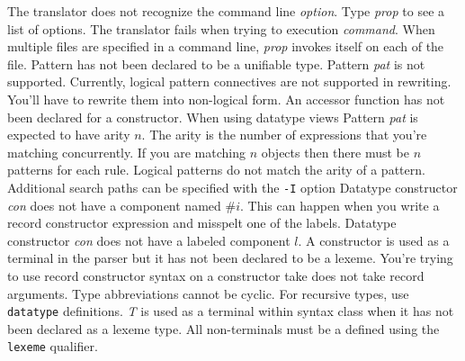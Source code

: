 \begin{Error}
  The translator does not recognize 
the command line {\em option}.   Type {\em prop} to see a list of options.
  The translator fails when trying
to execution {\em command}.  When multiple files are specified in a command
line, {\em prop} invokes itself on each of the file. 
  Pattern has not
been declared to be a unifiable type.   
  Pattern
{\em pat} is not supported.  Currently, logical pattern connectives
are not supported in rewriting.  You'll have to rewrite them into
non-logical form.
 An accessor
function has not been declared for a constructor.  When using datatype views
  Pattern
{\em pat} is expected to have arity $n$.   The arity is the number of
expressions that you're matching concurrently.  If you are matching $n$
objects then there must be $n$ patterns for each rule.
  Logical patterns
do not match the arity of a pattern.
  Additional search paths
can be specified with the \verb|-I| option
Datatype constructor {\em con} does not have a component named \#$i$.
This can happen when you write a record constructor expression and misspelt
one of the labels.
  Datatype
constructor {\em con} does not have a labeled component $l$.
  A constructor is used
as a terminal in the parser but it has not been declared to be a lexeme.
  You're trying
to use record constructor syntax on a constructor take does not take
record arguments.
Type abbreviations cannot be cyclic.  For recursive types, use \verb|datatype|
definitions.
  {\em T} is used as a
terminal within syntax class when it has not been declared as a lexeme type.
All non-terminals must be a defined using the \verb|lexeme| qualifier.
\end{Error}

